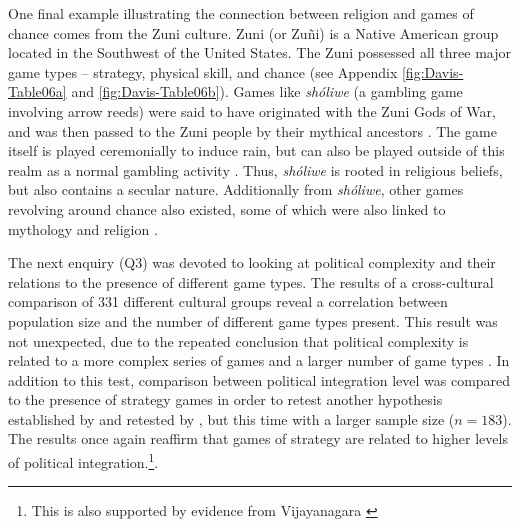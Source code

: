 \documentclass[%
	]{ijsra}
\begin{document}
One final example illustrating the connection between religion and games of chance comes from the Zuni culture. Zuni (or Zu\~{n}i) is a Native American group located in the Southwest of the United States. The Zuni possessed all three major game types – strategy, physical skill, and chance (see Appendix \cref{fig:Davis-Table06a} and \cref{fig:Davis-Table06b}). Games like \textit{sh\'{o}liwe} (a gambling game involving arrow reeds) were said to have originated with the Zuni Gods of War, and was then passed to the Zuni people by their mythical ancestors \parencite[480]{stevenson1903}. The game itself is played ceremonially to induce rain, but can also be played outside of this realm as a normal gambling activity \parencite[480]{stevenson1903}. Thus, \textit{sh\'{o}liwe} is rooted in religious beliefs, but also contains a secular nature. Additionally from \textit{sh\'{o}liwe}, other games revolving around chance also existed, some of which were also linked to mythology and religion \parencite{stevenson1903}. 

The next enquiry (Q3) was devoted to looking at political complexity and their relations to the presence of different game types. The results of a cross-cultural comparison of 331 different cultural groups reveal a correlation between population size and the number of different game types present. This result was not unexpected, due to the repeated conclusion that political complexity is related to a more complex series of games and a larger number of game types \parencites[291]{ball1972}[322]{chick1984}[195]{chick1998}{chick2015}{peregrine2008}{roberts1959}. In addition to this test, comparison between political integration level was compared to the presence of strategy games in order to retest another hypothesis established by \textcite{roberts1959} and retested by \textcite{chick1998}, but this time with a larger sample size ($n = 183$). The results once again reaffirm that games of strategy are related to higher levels of political integration.\footnote{This is also supported by evidence from Vijayanagara \parencite{rogersdotter2015}}.
\end{document}
